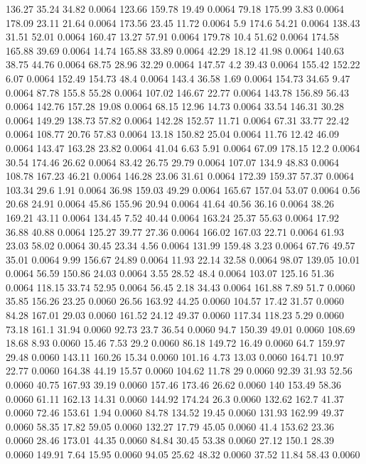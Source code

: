 136.27	35.24	34.82	0.0064
123.66	159.78	19.49	0.0064
79.18	175.99	3.83	0.0064
178.09	23.11	21.64	0.0064
173.56	23.45	11.72	0.0064
5.9	174.6	54.21	0.0064
138.43	31.51	52.01	0.0064
160.47	13.27	57.91	0.0064
179.78	10.4	51.62	0.0064
174.58	165.88	39.69	0.0064
14.74	165.88	33.89	0.0064
42.29	18.12	41.98	0.0064
140.63	38.75	44.76	0.0064
68.75	28.96	32.29	0.0064
147.57	4.2	39.43	0.0064
155.42	152.22	6.07	0.0064
152.49	154.73	48.4	0.0064
143.4	36.58	1.69	0.0064
154.73	34.65	9.47	0.0064
87.78	155.8	55.28	0.0064
107.02	146.67	22.77	0.0064
143.78	156.89	56.43	0.0064
142.76	157.28	19.08	0.0064
68.15	12.96	14.73	0.0064
33.54	146.31	30.28	0.0064
149.29	138.73	57.82	0.0064
142.28	152.57	11.71	0.0064
67.31	33.77	22.42	0.0064
108.77	20.76	57.83	0.0064
13.18	150.82	25.04	0.0064
11.76	12.42	46.09	0.0064
143.47	163.28	23.82	0.0064
41.04	6.63	5.91	0.0064
67.09	178.15	12.2	0.0064
30.54	174.46	26.62	0.0064
83.42	26.75	29.79	0.0064
107.07	134.9	48.83	0.0064
108.78	167.23	46.21	0.0064
146.28	23.06	31.61	0.0064
172.39	159.37	57.37	0.0064
103.34	29.6	1.91	0.0064
36.98	159.03	49.29	0.0064
165.67	157.04	53.07	0.0064
0.56	20.68	24.91	0.0064
45.86	155.96	20.94	0.0064
41.64	40.56	36.16	0.0064
38.26	169.21	43.11	0.0064
134.45	7.52	40.44	0.0064
163.24	25.37	55.63	0.0064
17.92	36.88	40.88	0.0064
125.27	39.77	27.36	0.0064
166.02	167.03	22.71	0.0064
61.93	23.03	58.02	0.0064
30.45	23.34	4.56	0.0064
131.99	159.48	3.23	0.0064
67.76	49.57	35.01	0.0064
9.99	156.67	24.89	0.0064
11.93	22.14	32.58	0.0064
98.07	139.05	10.01	0.0064
56.59	150.86	24.03	0.0064
3.55	28.52	48.4	0.0064
103.07	125.16	51.36	0.0064
118.15	33.74	52.95	0.0064
56.45	2.18	34.43	0.0064
161.88	7.89	51.7	0.0060
35.85	156.26	23.25	0.0060
26.56	163.92	44.25	0.0060
104.57	17.42	31.57	0.0060
84.28	167.01	29.03	0.0060
161.52	24.12	49.37	0.0060
117.34	118.23	5.29	0.0060
73.18	161.1	31.94	0.0060
92.73	23.7	36.54	0.0060
94.7	150.39	49.01	0.0060
108.69	18.68	8.93	0.0060
15.46	7.53	29.2	0.0060
86.18	149.72	16.49	0.0060
64.7	159.97	29.48	0.0060
143.11	160.26	15.34	0.0060
101.16	4.73	13.03	0.0060
164.71	10.97	22.77	0.0060
164.38	44.19	15.57	0.0060
104.62	11.78	29	0.0060
92.39	31.93	52.56	0.0060
40.75	167.93	39.19	0.0060
157.46	173.46	26.62	0.0060
140	153.49	58.36	0.0060
61.11	162.13	14.31	0.0060
144.92	174.24	26.3	0.0060
132.62	162.7	41.37	0.0060
72.46	153.61	1.94	0.0060
84.78	134.52	19.45	0.0060
131.93	162.99	49.37	0.0060
58.35	17.82	59.05	0.0060
132.27	17.79	45.05	0.0060
41.4	153.62	23.36	0.0060
28.46	173.01	44.35	0.0060
84.84	30.45	53.38	0.0060
27.12	150.1	28.39	0.0060
149.91	7.64	15.95	0.0060
94.05	25.62	48.32	0.0060
37.52	11.84	58.43	0.0060
